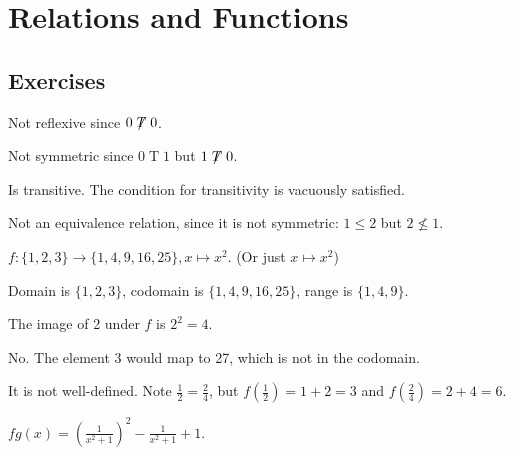 \section{Relations and Functions}
\subsection*{Exercises}
\begin{questions}
    \item \begin{partquestions}{\alph*}
        \item Not reflexive since $0\not\mathrel{T}0$.
        \item Not symmetric since $0\mathrel{T}1$ but $1\not\mathrel{T}0$.
        \item Is transitive. The condition for transitivity is vacuously satisfied.
    \end{partquestions}

    \item Not an equivalence relation, since it is not symmetric: $1 \leq 2$ but $2 \not\leq 1$.

    \item \begin{partquestions}{\roman*}
        \item $f: \{1, 2, 3\} \to \{1, 4, 9, 16, 25\}, x \mapsto x^2$. (Or just $x \mapsto x^2$)
        \item Domain is $\{1, 2, 3\}$, codomain is $\{1, 4, 9, 16, 25\}$, range is $\{1, 4, 9\}$.
        \item The image of 2 under $f$ is $2^2 = 4$.
        \item No. The element 3 would map to 27, which is not in the codomain.
    \end{partquestions}

    \item It is not well-defined. Note $\frac 12 = \frac 24$, but $f(\frac12) = 1 + 2 = 3$ and $f(\frac24) = 2 + 4 = 6$.

    \item $fg(x) = \left(\frac1{x^2+1}\right)^2 - \frac1{x^2+1} + 1$.


\end{questions}

